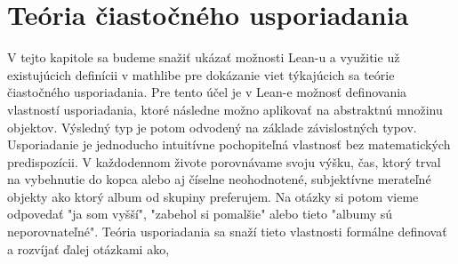 \documentclass[a4paper,10pt,oneside]{report}%
\begin{document}
\chapter{Teória čiastočného usporiadania}
    V tejto kapitole sa budeme snažiť ukázať možnosti Lean-u a využitie už existujúcich
definícii v mathlibe pre dokázanie viet týkajúcich sa teórie čiastočného usporiadania.
    Pre tento účel je v Lean-e možnosť definovania vlastností usporiadania, 
ktoré následne možno aplikovať na abstraktnú množinu objektov.
    Výsledný typ je potom odvodený na základe závislostných typov.
    Usporiadanie je jednoducho intuitívne pochopiteľná vlastnosť bez matematických
predispozícii.
    V každodennom živote porovnávame svoju výšku, čas, ktorý trval na vybehnutie do kopca
alebo aj číselne neohodnotené, subjektívne merateľné objekty ako ktorý album
od skupiny preferujem.
    Na otázky si potom vieme odpovedať "ja som vyšší", "zabehol si pomalšie" alebo
tieto "albumy sú neporovnateľné".
    Teória usporiadania sa snaží tieto vlastnosti formálne definovať a rozvíjať ďalej
otázkami ako,
\end{document}
